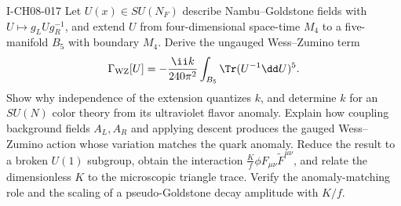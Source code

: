 \begin{exercise}{I-CH08-017}
Let $U(x)\in SU(N_F)$ describe Nambu--Goldstone fields with
$U\mapsto g_LUg_R^{-1}$, and extend $U$ from four-dimensional space-time
$M_4$ to a five-manifold $B_5$ with boundary $M_4$.  Derive the ungauged
Wess--Zumino term
\[
 \Gamma_{\rm WZ}[U]=-\frac{\ii k}{240\pi^2}
 \int_{B_5}\Tr(U^{-1}\dd U)^5.
\]
Show why independence of the extension quantizes $k$, and determine $k$ for
an $SU(N)$ color theory from its ultraviolet flavor anomaly.  Explain how
coupling background fields $A_L,A_R$ and applying descent produces the gauged
Wess--Zumino action whose variation matches the quark anomaly.  Reduce the
result to a broken $U(1)$ subgroup, obtain the interaction
$\frac{K}{f}\phi F_{\mu\nu}\widetilde F^{\mu\nu}$, and relate the
dimensionless $K$ to the microscopic triangle trace.  Verify the
anomaly-matching role and the scaling of a
pseudo-Goldstone decay amplitude with $K/f$.
\end{exercise}
